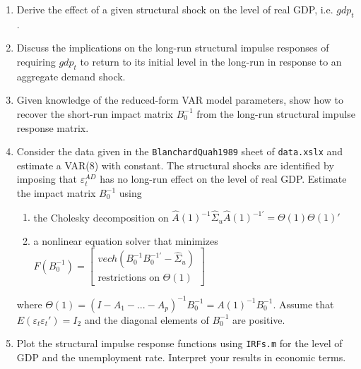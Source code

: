 \documentclass[a4paper]{scrartcl}
\begin{document}
    \begin{enumerate}
        \item Derive the effect of a given structural shock on the level of real GDP, i.e. $gdp_t$.
        \item Discuss the implications  on the long-run structural impulse responses of requiring $gdp_t$ to return to its initial level in the long-run in response to an aggregate demand shock.
        \item Given knowledge of the reduced-form VAR model parameters, show how to recover the short-run impact matrix $B_0^{-1}$ from the long-run structural impulse response matrix.
        \item Consider the data given in the \texttt{BlanchardQuah1989} sheet of \texttt{data.xslx} and estimate a VAR(8) with constant. The structural shocks are identified by imposing that $\varepsilon_t^{AD}$ has no long-run effect on the level of real GDP. Estimate the impact matrix $B_0^{-1}$ using
              \begin{enumerate}
                  \item the Cholesky decomposition on $\hat{A}(1)^{-1}\hat{\Sigma}_u\hat{A}(1)^{-1'}= \Theta(1) \Theta(1)'$
                  \item a nonlinear equation solver that minimizes $F(B_0^{-1}) = \begin{bmatrix}
                                vech(B_0^{-1}B_0^{-1'}-\hat{\Sigma}_u) \\
                                \text{restrictions on } \Theta(1)
                            \end{bmatrix}$
              \end{enumerate}
              where $\Theta(1)=(I-A_1-...-A_p)^{-1}B_0^{-1} = A(1)^{-1}B_0^{-1}$. Assume that
              $E(\varepsilon_t\varepsilon_t')=I_2$ and the diagonal elements of $B_0^{-1}$ are positive.
        \item Plot the structural impulse response functions using \texttt{IRFs.m} for the level of GDP and the unemployment rate. Interpret your results in economic terms.
    \end{enumerate}
    \newpage
    
\end{document}
